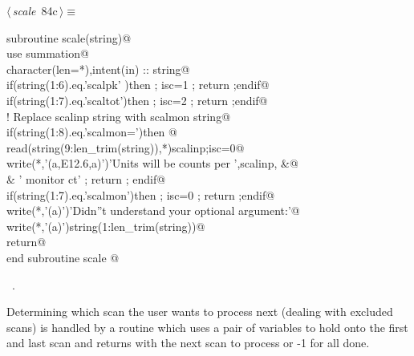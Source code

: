 \documentclass[10pt,a4paper,notitlepage]{article}
\begin{document}
\begin{flushleft} \small
\begin{minipage}{\linewidth}\label{scrap105}\raggedright\small
{} $\langle\,${\it scale}\nobreak\ {\footnotesize {84c}}$\,\rangle\equiv$
\vspace{-1ex}
\begin{list}{}{} \item
\mbox{}\verb@      subroutine scale(string)@\\
\mbox{}\verb@      use summation@\\
\mbox{}\verb@      character(len=*),intent(in) :: string@\\
\mbox{}\verb@      if(string(1:6).eq.'scalpk' )then ; isc=1 ; return ;endif@\\
\mbox{}\verb@      if(string(1:7).eq.'scaltot')then ; isc=2 ; return ;endif@\\
\mbox{}\verb@! Replace scalinp string with scalmon string@\\
\mbox{}\verb@      if(string(1:8).eq.'scalmon=')then @\\
\mbox{}\verb@       read(string(9:len_trim(string)),*)scalinp;isc=0@\\
\mbox{}\verb@       write(*,'(a,E12.6,a)')'Units will be counts per ',scalinp,       &@\\
\mbox{}\verb@     &  ' monitor ct' ; return ; endif@\\
\mbox{}\verb@      if(string(1:7).eq.'scalmon')then ; isc=0 ; return ;endif@\\
\mbox{}\verb@      write(*,'(a)')'Didn''t understand your optional argument:'@\\
\mbox{}\verb@      write(*,'(a)')string(1:len_trim(string))@\\
\mbox{}\verb@      return@\\
\mbox{}\verb@      end subroutine scale                                                 @{\NWsep}
\end{list}
\vspace{-1.5ex}
\footnotesize
\begin{list}{}{\setlength{\itemsep}{-\parsep}\setlength{\itemindent}{-\leftmargin}}
\item \NWtxtMacroRefIn\ .

\item{}
\end{list}
\end{minipage}\vspace{4ex}
\end{flushleft}
Determining which scan the user wants to process next (dealing with excluded 
scans) is handled by a routine which uses a pair of variables to hold
onto the first and last scan and returns with the next scan to process
or -1 for all done.
\end{document}
